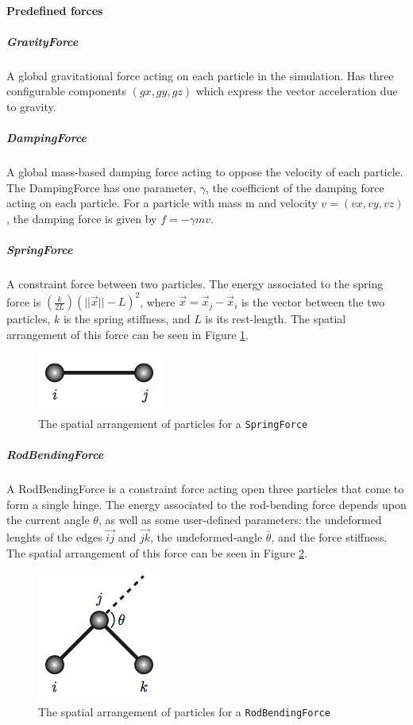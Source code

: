 \paragraph{Predefined forces}
\subparagraph{GravityForce}

A global gravitational force acting on each particle in the
simulation. Has three configurable components $(gx, gy, gz)$ which
express the vector acceleration due to gravity.

\subparagraph{DampingForce}

A global mass-based damping force acting to oppose the velocity of
each particle. The DampingForce has one parameter, $\gamma$, the
coefficient of the damping force acting on each particle. For a
particle with mass m and velocity $v = (vx, vy, vz)$, the damping force
is given by $f = -\gamma mv$.

\subparagraph{SpringForce}

A constraint force between two particles. The energy associated to the
spring force is $(\frac{k}{2L}) (||\vec{x}||−L)^2$, where $\vec{x} =
\vec{x}_j −\vec{x}_i$ is the vector between the two particles, $k$ is
the spring stiffness, and $L$ is its rest-length. The spatial
arrangement of this force can be seen in Figure \ref{fig:springf}.

\begin{figure}
  \centering
  \includegraphics{figures/SpringForce}
  \caption{The spatial arrangement of particles for a \texttt{SpringForce}}
  \label{fig:springf}
\end{figure}

\subparagraph{RodBendingForce}

A RodBendingForce is a constraint force acting open three particles
that come to form a single hinge. The energy associated to the
rod-bending force depends upon the current angle $\theta$, as well as
some user-defined parameters: the undeformed lenghts of the edges
$\vec{ij}$ and $\vec{jk}$, the undeformed-angle $\bar{\theta}$, and
the force stiffness. The spatial arrangement of this force can be seen
in Figure \ref{fig:rodf}.

\begin{figure}
  \centering
  \includegraphics{figures/RodBending}
  \caption{The spatial arrangement of particles for a \texttt{RodBendingForce}}
  \label{fig:rodf}
\end{figure}

